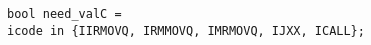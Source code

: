 \documentclass{article}
\begin{document}
\texttt{bool need\_valC =\\
\hspace*{15mm} icode in \{IIRMOVQ, IRMMOVQ, IMRMOVQ, IJXX, ICALL\};
}
\end{document}
